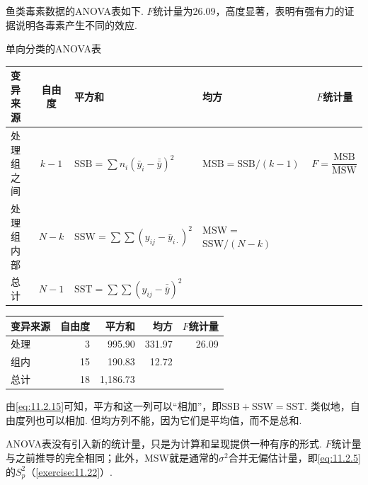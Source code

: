 \begin{example}[\autoref{ex:11.2.1}续]\label{ex:11.2.12}
鱼类毒素数据的ANOVA表如下. $F$统计量为26.09，高度显著，表明有强有力的证据说明各毒素产生不同的效应.
\end{example}
\begin{center}
单向分类的ANOVA表

\small
\begin{tabular}{p{}cp{}p{}c}
\toprule 变异来源&自由度&平方和&均方&$F$统计量\\\midrule
处理组之间&$k-1$&$\mathrm{SSB}=\sum n_i(\bar y_i-\bar{\bar y})^2$&$\mathrm{MSB}=\mathrm{SSB}/(k-1)$&$F=\dfrac{\mathrm{MSB}}{\mathrm{MSW}}$\\[1ex]
处理组内部&$N-k$&$\mathrm{SSW}=\sum\sum(y_{ij}-\bar y_{i\cdot})^2$&$\mathrm{MSW}=$\newline$\mathrm{SSW}/(N-k)$&\\[1ex]
总计&$N-1$&$\mathrm{SST}=\sum\sum(y_{ij}-\bar{\bar y})^2$&&\\\bottomrule
\end{tabular}

\medskip
\begin{tabular}{lrrrr}
\toprule 变异来源&自由度&平方和&均方&$F$统计量\\\midrule
处理&3&995.90&331.97&26.09\\
组内&15&190.83&12.72&\\
总计&18&1,186.73&&\\\bottomrule
\end{tabular}
\end{center}

由\eqref{eq:11.2.15}可知，平方和这一列可以“相加”，即$\mathrm{SSB}+\mathrm{SSW}=\mathrm{SST}$. 类似地，自由度列也可以相加. 但均方列不能，因为它们是平均值，而不是总和.

ANOVA表没有引入新的统计量，只是为计算和呈现提供一种有序的形式. $F$统计量与之前推导的完全相同；此外，MSW就是通常的$\sigma^2$合并无偏估计量，即\eqref{eq:11.2.5}的$S_p^2$（\autoref{exercise:11.22}）.
